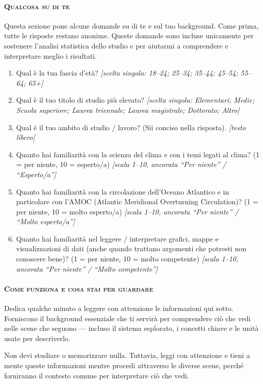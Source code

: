 \paragraph{\textsc{Qualcosa su di te}}
Questa sezione pone alcune domande su di te e sul tuo background. Come prima, tutte le risposte
restano anonime. Queste domande sono incluse unicamente per sostenere l'analisi statistica dello
studio e per aiutarmi a comprendere e interpretare meglio i risultati.

\begin{enumerate}[leftmargin=2em, itemsep=3pt]
\item Qual è la tua fascia d'età? \emph{[scelta singola: 18--24; 25--34; 35--44; 45--54; 55--64;
      65+]}
\item Qual è il tuo titolo di studio più elevato? \emph{[scelta singola: Elementari; Medie;
      Scuola superiore; Laurea triennale; Laurea magistrale; Dottorato; Altro]}
\item Qual è il tuo ambito di studio / lavoro? (Sii conciso nella risposta).
      \emph{[testo libero]}
\item Quanto hai familiarità con la scienza del clima e con i temi legati al clima?
      (1 = per niente, 10 = esperto/a) \emph{[scala 1--10, ancorata ``Per niente'' /
      ``Esperto/a'']}
\item Quanto hai familiarità con la circolazione dell'Oceano Atlantico e in particolare con l'AMOC
      (Atlantic Meridional Overturning Circulation)? (1 = per niente, 10 = molto esperto/a)
      \emph{[scala 1--10, ancorata ``Per niente'' / ``Molto esperto/a'']}
\item Quanto hai familiarità nel leggere / interpretare grafici, mappe e visualizzazioni di dati
      (anche quando trattano argomenti che potresti non conoscere bene)? (1 = per niente,
      10 = molto competente) \emph{[scala 1--10, ancorata ``Per niente'' / ``Molto competente'']}
\end{enumerate}

\paragraph{\textsc{Come funziona e cosa stai per guardare}}
Dedica qualche minuto a leggere con attenzione le informazioni qui sotto. Forniscono il background
essenziale che ti servirà per comprendere ciò che vedi nelle scene che seguono --- incluso il
sistema esplorato, i concetti chiave e le unità usate per descriverlo.

Non devi studiare o memorizzare nulla. Tuttavia, leggi con attenzione e tieni a mente queste
informazioni mentre procedi attraverso le diverse scene, perché forniranno il contesto comune per
interpretare ciò che vedi.

